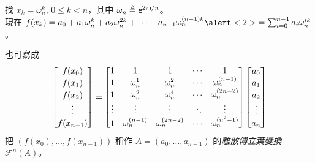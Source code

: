 \documentclass[standalone]{beamer}
\begin{document}
\def\myaddv{\vphantom{\omega_n^{()}}}
\begin{frame}{}
  找 $x_k = \omega_n^k, \, 0 \leq k < n$，其中 $\omega_n \triangleq \mathsf{e}^{2 \pi \mathsf{i} / n}$。\\
  \pause
  現在 $f(x_k) = a_0 + a_1 \omega_n^k + a_2 \omega_n^{2k} + \dots + a_{n-1} \omega_n^{(n-1)k}
  \alert<2>{= \sum_{i=0}^{n-1} a_i \omega_n^{ik}}$。
  \pause

  也可寫成
  \[ 
    \begin{bmatrix}
      f(x_0) \\ f(x_1) \myaddv \\ f(x_2) \myaddv \\ \vdots \\ f(x_{n-1}) \myaddv
    \end{bmatrix}
    = 
  \begin{bmatrix}
    1 & 1 & 1 & \cdots & 1 \\
    1 & \omega_n^{1} & \omega_n^{2} & \cdots & \omega_n^{(n-1)} \\
    1 & \omega_n^{2} & \omega_n^{4} & \cdots & \omega_n^{(2n-2)} \\
    \vdots & \vdots & \vdots & \ddots & \vdots \\
    1 & \omega_n^{(n-1)} & \omega_n^{(2n-2)} & \cdots & \omega_n^{(n^2-1)} \\
  \end{bmatrix}
    \begin{bmatrix}
      a_0 \\ a_1 \myaddv \\ a_2 \myaddv \\ \vdots \\ a_n \myaddv
    \end{bmatrix}
  \]
  \pause
  把 $(f(x_0), \dots, f(x_{n-1}))$ 稱作 $A = (a_0, \dots, a_{n-1})$ 的\emph{離散傅立葉變換} $\mathcal{F}^n(A)$。
\end{frame}
\def\aat #1#2{\action<alert@#1>{#2}}
\end{document}
